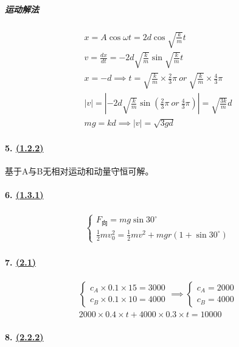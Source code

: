 \subparagraph{运动解法}

\begin{gather*}
    x=A\cos\omega t=2d\cos\sqrt{\frac{k}{m}}t\\
    v=\frac{dx}{dt}=-2d\sqrt{\frac{k}{m}}\sin\sqrt{\frac{k}{m}}t\\
    x=-d\implies t=\sqrt{\frac{k}{m}}\times\frac23\pi\ or\ \sqrt{\frac{k}{m}}\times\frac43\pi\\
    |v|=\left|-2d\sqrt{\frac{k}{m}}\sin\left(\frac23\pi\ or\ \frac43\pi\right)\right|=\sqrt{\frac{3k}{m}}d\\
    mg=kd\implies|v|=\sqrt{3gd}
\end{gather*}

\paragraph{5. \hyperref[subsec:1.2.2]{(1.2.2)}} 基于A与B无相对运动和动量守恒可解。

\paragraph{6. \hyperref[subsec:1.3.1]{(1.3.1)}}

\begin{gather*}
    \begin{cases}
        F_\textrm{向}=mg\sin30^\circ\\
        \frac12mv_0^2=\frac12mv^2+mgr(1+\sin30^\circ)
    \end{cases}
\end{gather*}

\paragraph{7. \hyperref[sec:2.1]{(2.1)}}

\begin{gather*}
    \begin{cases}
        c_A\times0.1\times15=3000\\
        c_B\times0.1\times10=4000
    \end{cases}\implies
    \begin{cases}
        c_A=2000\\
        c_B=4000
    \end{cases}\\
    2000\times0.4\times t+4000\times0.3\times t=10000
\end{gather*}

\paragraph{8. \hyperref[subsec:2.2.2]{(2.2.2)}}

